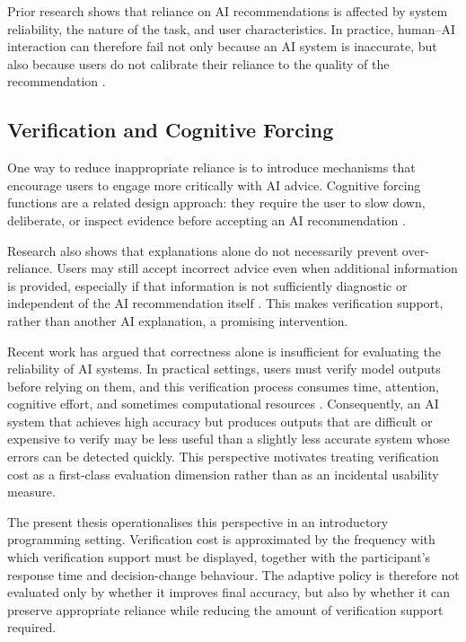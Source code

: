 \documentclass[oneside,final,14pt,a4paper]{extreport}
\theoremstyle{definition}
\theoremstyle{remark}
\begin{document}
Prior research shows that reliance on AI recommendations is affected by system
reliability, the nature of the task, and user characteristics. In practice,
human--AI interaction can therefore fail not only because an AI system is
inaccurate, but also because users do not calibrate their reliance to the
quality of the recommendation \cite{PoursabziSangdeh2021,Vasconcelos2023}.

\subsection{Verification and Cognitive Forcing}
One way to reduce inappropriate reliance is to introduce mechanisms that
encourage users to engage more critically with AI advice. Cognitive forcing
functions are a related design approach: they require the user to slow down,
deliberate, or inspect evidence before accepting an AI recommendation
\cite{Bucinca2021}.

Research also shows that explanations alone do not necessarily prevent
over-reliance. Users may still accept incorrect advice even when additional
information is provided, especially if that information is not sufficiently
diagnostic or independent of the AI recommendation itself \cite{Vasconcelos2023}.
This makes verification support, rather than another AI explanation, a
promising intervention.

Recent work has argued that correctness alone is insufficient for evaluating
the reliability of AI systems. In practical settings, users must verify model
outputs before relying on them, and this verification process consumes time,
attention, cognitive effort, and sometimes computational resources
\cite{VerificationCost2026}. Consequently, an AI system that achieves high
accuracy but produces outputs that are difficult or expensive to verify may be
less useful than a slightly less accurate system whose errors can be detected
quickly. This perspective motivates treating verification cost as a first-class
evaluation dimension rather than as an incidental usability measure.

The present thesis operationalises this perspective in an introductory
programming setting. Verification cost is approximated by the frequency with
which verification support must be displayed, together with the participant's
response time and decision-change behaviour. The adaptive policy is therefore
not evaluated only by whether it improves final accuracy, but also by whether
it can preserve appropriate reliance while reducing the amount of verification
support required.
\end{document}
